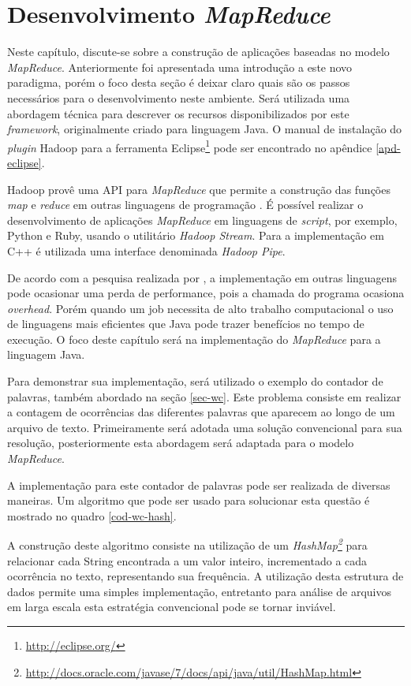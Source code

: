 \chapter{Desenvolvimento \textit{MapReduce}}
\label{cap:mapreduce-devel}

Neste capítulo, discute-se sobre a construção de aplicações baseadas no modelo \textit{MapReduce}. Anteriormente foi apresentada uma introdução a este novo paradigma, porém o foco desta seção é deixar claro quais são os passos necessários para o desenvolvimento neste ambiente. Será utilizada uma abordagem técnica para descrever os recursos disponibilizados por este \textit{framework}, originalmente criado para linguagem Java. O manual de instalação do \textit{plugin} Hadoop para a ferramenta Eclipse\footnote{\url{http://eclipse.org/}} pode ser encontrado no apêndice \ref{apd-eclipse}.

Hadoop provê uma API para \textit{MapReduce} que permite a construção das funções \textit{map} e \textit{reduce} em outras linguagens de programação \cite{white2012}. É possível realizar o desenvolvimento de aplicações \textit{MapReduce} em linguagens de \textit{script}, por exemplo, Python e Ruby, usando o utilitário \textit{Hadoop Stream}. Para a implementação em C++ é utilizada uma interface denominada \textit{Hadoop Pipe}.

De acordo com a pesquisa realizada por , a implementação em outras linguagens pode ocasionar uma perda de performance, pois a chamada do programa ocasiona \textit{overhead}. Porém quando um job necessita de alto trabalho computacional o uso de linguagens mais eficientes que Java pode trazer benefícios no tempo de execução. O foco deste capítulo será na implementação do \textit{MapReduce} para a linguagem Java.

Para demonstrar sua implementação, será utilizado o exemplo do contador de palavras, também abordado na seção \ref{sec-wc}. Este problema consiste em realizar a contagem de ocorrências das diferentes palavras que aparecem ao longo de um arquivo de texto. Primeiramente será adotada uma solução convencional para sua resolução, posteriormente esta abordagem será adaptada para o modelo \textit{MapReduce}.

A implementação para este contador de palavras pode ser realizada de diversas maneiras. Um algoritmo que pode ser usado para solucionar esta questão é mostrado no quadro \ref{cod-wc-hash}.

A construção deste algoritmo consiste na utilização de um \textit{HashMap\footnote{\url{http://docs.oracle.com/javase/7/docs/api/java/util/HashMap.html}}} para relacionar cada String encontrada a um valor inteiro, incrementado a cada ocorrência no texto, representando sua frequência. A utilização desta estrutura de dados permite uma simples implementação, entretanto para análise de arquivos em larga escala esta estratégia convencional pode se tornar inviável.

